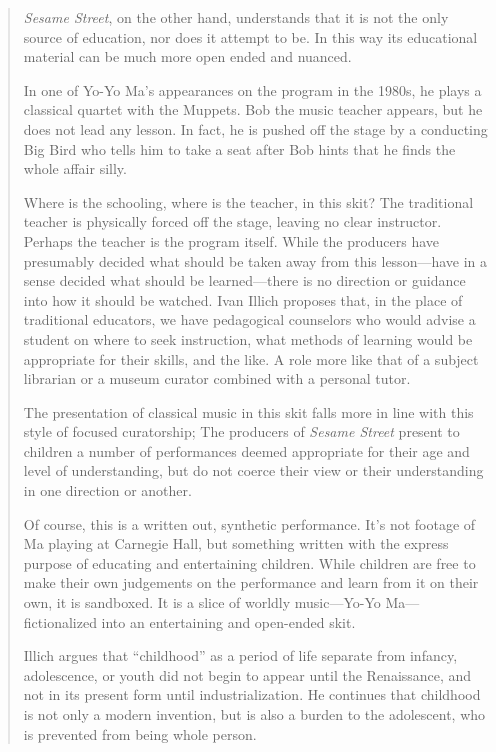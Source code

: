 \documentclass[12pt,letterpaper]{article}
\begin{document}
\begin{quote}
	\textit{Sesame Street}, on the other hand, understands that it is not 
	the only source of education, nor does it attempt to be. In this way its
	educational material can be much more open ended and nuanced. 

	In one of Yo-Yo Ma's appearances on the program in the 1980s, he plays
	a classical quartet with the Muppets. Bob the music teacher appears, 
	but he does not lead any lesson. In fact, he is pushed off the stage by 
	a conducting Big Bird who tells him to take a seat after Bob hints that
	he finds the whole affair silly.

	Where is the schooling, where is the teacher, in this skit? The 
	traditional teacher is physically forced off the stage, leaving no clear
	instructor.  Perhaps the teacher is the program itself.  While the 
	producers have presumably decided what should be taken away from this 
	lesson---have in a sense decided what should be learned---there is no 
	direction or guidance into how it should be watched. Ivan Illich
	proposes that, in the place of traditional educators, we have
	pedagogical counselors who would advise a student on where to seek 
	instruction, what methods of learning would be appropriate for their 
	skills, and the like. A role more like that of a subject librarian or a 
	museum curator combined with a personal tutor.\autocite[43]{Illich}

	The presentation of classical music in this skit falls more in line with
	this style of focused curatorship; The producers of \textit{Sesame 
	Street} present to children a number of performances deemed appropriate
	for their age and level of understanding, but do not coerce their view 
	or their understanding in one direction or another.


	Of course, this is a written out, synthetic performance. It's not 
	footage of Ma playing at Carnegie Hall, but something written with the 
	express purpose of educating and entertaining children. While children 
	are free to make their own judgements on the performance and learn from
	it on their own, it is sandboxed. It is a slice of worldly music---Yo-Yo
	Ma---fictionalized into an entertaining and open-ended skit. 

	Illich argues that ``childhood'' as a period of life separate from 
	infancy, adolescence, or youth did not begin to appear until the 
	Renaissance, and not in its present form until industrialization.
	\autocite[13]{Illich} He continues that childhood is not only a modern
	invention, but is also a burden to the adolescent, who is prevented 
	from being whole person.\autocite[14]{Illich}


\end{quote}
\end{document}
